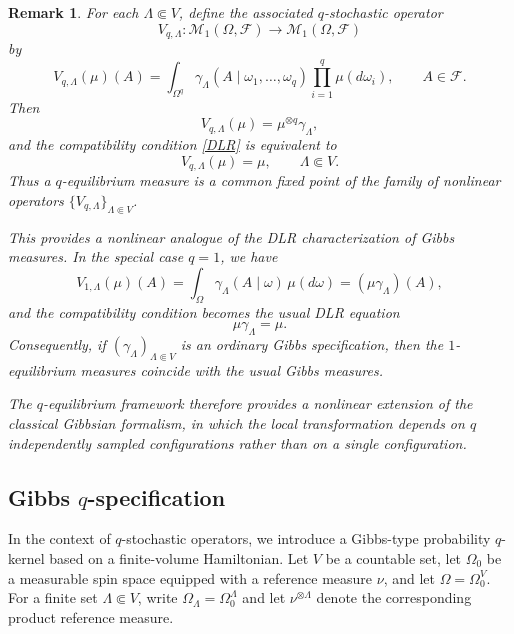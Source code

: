 \documentclass[11pt,reqno]{amsart}
\newtheorem{rk}{Remark}
\numberwithin{equation}{section} \setcounter{tocdepth}{1}
\begin{document}
\begin{rk}
	For each $\Lambda\Subset V$, define the associated
	$q$-stochastic operator
	\[
	V_{q,\Lambda}:
	\mathcal M_1(\Omega,\mathcal F)
	\longrightarrow
	\mathcal M_1(\Omega,\mathcal F)
	\]
	by
	\begin{equation}\label{qSO}
		V_{q,\Lambda}(\mu)(A)
		=
		\int_{\Omega^q}
		\gamma_\Lambda(A\mid\omega_1,\ldots,\omega_q)
		\prod_{i=1}^q\mu(d\omega_i),
		\qquad
		A\in\mathcal F.
	\end{equation}
	Then
	\[
	V_{q,\Lambda}(\mu)
	=
	\mu^{\otimes q}\gamma_\Lambda,
	\]
	and the compatibility condition \eqref{DLR} is equivalent to
	\[
	V_{q,\Lambda}(\mu)=\mu,
	\qquad
	\Lambda\Subset V.
	\]
	Thus a $q$-equilibrium measure is a common fixed point of the family
	of nonlinear operators
	$\{V_{q,\Lambda}\}_{\Lambda\Subset V}$.
	
	This provides a nonlinear analogue of the DLR characterization of
	Gibbs measures. In the special case $q=1$, we have
	\[
	V_{1,\Lambda}(\mu)(A)
	=
	\int_\Omega
	\gamma_\Lambda(A\mid\omega)\,\mu(d\omega)
	=
	(\mu\gamma_\Lambda)(A),
	\]
	and the compatibility condition becomes the usual DLR equation
	\[
	\mu\gamma_\Lambda=\mu.
	\]
	Consequently, if
	$(\gamma_\Lambda)_{\Lambda\Subset V}$ is an ordinary Gibbs
	specification, then the $1$-equilibrium measures coincide with the
	usual Gibbs measures.
	
	The $q$-equilibrium framework therefore provides a nonlinear extension
	of the classical Gibbsian formalism, in which the local transformation
	depends on $q$ independently sampled configurations rather than on a
	single configuration.
\end{rk}

\subsection{Gibbs $q$-specification}

In the context of $q$-stochastic operators, we introduce a Gibbs-type
probability $q$-kernel based on a finite-volume Hamiltonian. Let
$V$ be a countable set, let $\Omega_0$ be a measurable spin space
equipped with a reference measure $\nu$, and let
$\Omega=\Omega_0^V$. For a finite set $\Lambda\Subset V$, write
$\Omega_\Lambda=\Omega_0^\Lambda$ and let
$\nu^{\otimes\Lambda}$ denote the corresponding product reference
measure.
\end{document}
